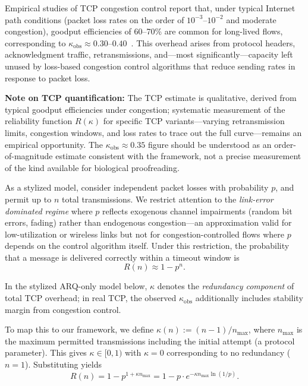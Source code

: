 \documentclass[11pt,twocolumn]{article}
\begin{document}
Empirical studies of TCP congestion control report that, under typical Internet path conditions (packet loss rates on the order of $10^{-3}$--$10^{-2}$ and moderate congestion), goodput efficiencies of 60--70\% are common for long-lived flows, corresponding to $\kappa_{\mathrm{obs}} \approx 0.30$--$0.40$~\cite{Mathis1997,Ha2008}. This overhead arises from protocol headers, acknowledgment traffic, retransmissions, and---most significantly---capacity left unused by loss-based congestion control algorithms that reduce sending rates in response to packet loss.

\textbf{Note on TCP quantification:} The TCP estimate is qualitative, derived from typical goodput efficiencies under congestion; systematic measurement of the reliability function $R(\kappa)$ for specific TCP variants---varying retransmission limits, congestion windows, and loss rates to trace out the full curve---remains an empirical opportunity. The $\kappa_{\mathrm{obs}} \approx 0.35$ figure should be understood as an order-of-magnitude estimate consistent with the framework, not a precise measurement of the kind available for biological proofreading.

As a stylized model, consider independent packet losses with probability $p$, and permit up to $n$ total transmissions. We restrict attention to the \emph{link-error dominated regime} where $p$ reflects exogenous channel impairments (random bit errors, fading) rather than endogenous congestion---an approximation valid for low-utilization or wireless links but not for congestion-controlled flows where $p$ depends on the control algorithm itself. Under this restriction, the probability that a message is delivered correctly within a timeout window is
\begin{equation}
R(n) \approx 1 - p^{n}.
\label{eq:tcp_reliability}
\end{equation}

In the stylized ARQ-only model below, $\kappa$ denotes the \emph{redundancy component} of total TCP overhead; in real TCP, the observed $\kappa_{\mathrm{obs}}$ additionally includes stability margin from congestion control.

To map this to our framework, we define $\kappa(n) := (n-1)/n_{\max}$, where $n_{\max}$ is the maximum permitted transmissions including the initial attempt (a protocol parameter). This gives $\kappa \in [0, 1)$ with $\kappa = 0$ corresponding to no redundancy ($n=1$). Substituting yields
\begin{equation}
R(n) = 1 - p^{1 + \kappa n_{\max}} = 1 - p \cdot e^{-\kappa n_{\max} \ln(1/p)}.
\end{equation}
\end{document}
